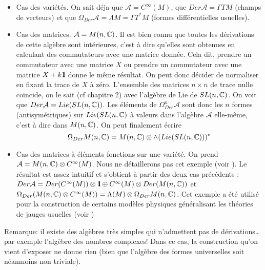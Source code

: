 \begin{itemize}
	\item  Cas des vari\'et\'es. On sait d\'eja que ${\mathcal A}=C^\infty(M)$, 
	que $Der{\mathcal A} = \Gamma TM$ (champs de vecteurs) et que
	${\Omega}_{Der}{\mathcal A} = \Lambda M = \Gamma T^{*}M$ (formes 
	diff\'erentielles usuelles).

	\item  Cas des matrices. ${\mathcal A}=M(n,\mathbb{C})$. Il est bien connu 
	que toutes les d\'erivations de cette alg\`ebre sont int\'erieures, c'est 
	\`a dire qu'elles sont obtenues en calculant des commutateurs avec une 
	matrice donn\'ee. Cela dit, prendre un commutateur avec une matrice $X$ 
	ou prendre un commutateur avec une matrice $X + k \mbox{\rm 1}\hskip-3pt \mbox{\rm l}$ donne le 
	m\^eme r\'esultat. On peut donc d\'ecider de normaliser en fixant la trace de 
	$X$ \`a z\'ero. L'ensemble des matrices $n\times n$ de trace nulle 
	co\"incide, on le sait (cf chapitre 2) avec l'alg\`ebre de Lie de 
	$SL(n,\mathbb{C})$. 
	On voit que $Der{\mathcal A} = Lie(SL(n,\mathbb{C}))$. Les \'el\'ements de 
	${\Omega}_{Der}^n{\mathcal A}$ sont donc les $n$ formes 
	(antisym\'etriques) sur $Lie(SL(n,\mathbb{C})$ \`a valeurs dans l'alg\`ebre ${\mathcal 
	A}$ elle-m\^eme, c'est \`a dire dans $M(n,\mathbb{C})$. On peut finalement \'ecrire
	$${\Omega}_{Der}M(n,\mathbb{C}) = M(n,\mathbb{C}) \otimes \land (Lie(SL(n,\mathbb{C})))^{*}$$

	\item  Cas des matrices \`a \'el\'ements fonctions sur une vari\'et\'e. On 
	prend  ${\mathcal A}=M(n,\mathbb{C}) \otimes C^\infty(M)$. Nous ne 
	d\'etaillerons pas cet exemple (voir \cite{MDV-cras}). Le r\'esultat est assez 
	intuitif  et s'obtient \`a partir des deux cas pr\'ec\'edents :
	 $Der{\mathcal A} = Der(C^\infty(M)) \otimes \mbox{\rm 1}\hskip-3pt \mbox{\rm l} \oplus 
	 C^\infty(M) \otimes Der(M(n,\mathbb{C}))$ et 
	 $\Omega_{Der}(M(n,\mathbb{C}) \otimes C^\infty(M)) = \Lambda(M) \otimes 
	 \Omega_{Der}M(n,\mathbb{C})$. Cet exemple a \'et\'e utilis\'e pour la construction 
	 de certains mod\`eles physiques g\'en\'eralisant les th\'eories de jauges usuelles 
	 (voir \cite{MDVKernerMadore})
	 
\end{itemize}

Remarque: il existe des alg\`ebres tr\`es simples qui n'admettent pas de 
d\'erivations\ldots par exemple l'alg\`ebre des nombres complexes!
Dans ce cas, la construction qu'on vient d'exposer ne donne rien 
(bien que l'alg\`ebre des formes universelles soit n\'eanmoins non triviale).



